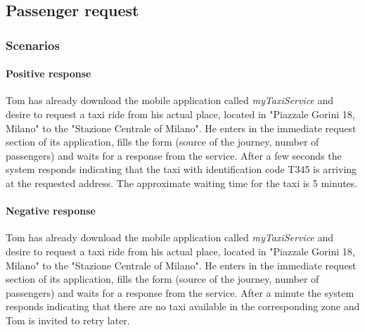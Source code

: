 \pagebreak
\subsection{Passenger request}
\subsubsection{Scenarios}
\paragraph{Positive response}
Tom has already download the mobile application called \textit{myTaxiService} and desire to request a taxi ride from his actual place, located in "Piazzale Gorini 18, Milano" to the "Stazione Centrale of Milano". He enters in the immediate request section of its application, fills the form (source of the journey, number of passengers) and waits for a response from the service.
After a few seconds the system responds indicating that the taxi with identification code T345 is arriving at the requested address. The approximate waiting time for the taxi is 5 minutes.

\paragraph{Negative response}
Tom has already download the mobile application called \textit{myTaxiService} and desire to request a taxi ride from his actual place, located in "Piazzale Gorini 18, Milano" to the "Stazione Centrale of Milano". He enters in the immediate request section of its application, fills the form (source of the journey, number of passengers) and waits for a response from the service.
After a minute the system responds indicating that there are no taxi available in the corresponding zone and Tom is invited to retry later.

